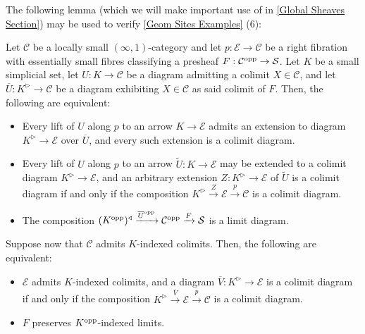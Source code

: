 \documentclass[10pt]{article}
\newcommand{\mS}{\mathcal S}
\newcommand{\C}{\mathcal C}
\newcommand{\cE}{\mathcal{E}}
\theoremstyle{witharg}
\theoremstyle{witharg}
\theoremstyle{witharg2}
\begin{document}
\noindent The following lemma (which we will make important use of in \ref{Global Sheaves Section}) may be used to verify \ref{Geom Sites Examples} (6):

\begin{lemma}{}\label{Colimits in Right Fibrations}

    Let $\C$ be a locally small $(\infty,1)$-category and let $p:\cE\rightarrow \C$ be a right fibration with essentially small fibres classifying a presheaf $F:\C^{\textnormal{opp}}\rightarrow \mS$. Let $K$ be a small simplicial set, let $U:K\rightarrow \C$ be a diagram admitting a colimit $X\in \C$, and let $\overline{U}:K^\triangleright\rightarrow \C$ be a diagram exhibiting $X\in \C$ as said colimit of $F$. Then, the following are equivalent: 

    \begin{itemize}
    
        \item [$(1)$] Every lift of $U$ along $p$ to an arrow $K\rightarrow \cE$ admits an extension to diagram $K^\triangleright \rightarrow \cE$ over $\overline{U}$, and every such extension is a colimit diagram.

        \item [$(2)$] Every lift of $U$ along $p$ to an arrow $\widetilde{U}:K\rightarrow \cE$ may be extended to a colimit diagram $K^\triangleright\rightarrow \cE$, and an arbitrary extension $Z:K^\triangleright\rightarrow \cE$ of $\widetilde{U}$ is a colimit diagram if and only if the composition $K^\triangleright\xrightarrow{Z} \cE\xrightarrow{p}\C$ is a colimit diagram. 

        \item [$(3)$] The composition $(K^{\textnormal{opp}})^\triangleleft\xrightarrow{\overline{U}^{\textnormal{opp}}}\C^{\textnormal{opp}}\xrightarrow{F}\mS$ is a limit diagram. 
        
    \end{itemize}

    \noindent Suppose now that $\C$ admits $K$-indexed colimits. Then, the following are equivalent: 

    \begin{itemize}
    
        \item [$(1^\prime)$] $\cE$ admits $K$-indexed colimits, and a diagram $\overline{V}:K^\triangleright\rightarrow \cE$ is a colimit diagram if and only if the composition $K^\triangleright\xrightarrow{\overline{V}} \cE\xrightarrow{p}\C$ is a colimit diagram. 

        \item [$(2^\prime)$] $F$ preserves $K^{\textnormal{opp}}$-indexed limits. 
        
    \end{itemize}


    
    
    
    
\end{lemma}
\end{document}
